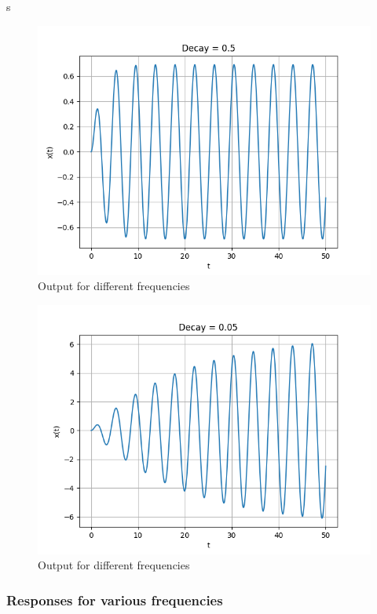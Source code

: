s\documentclass{article}
\begin{document}
 \begin{figure}[!ht]
  \centering
  \includegraphics[scale=0.5]{Figure_0.png}
  \caption{Output for different frequencies}
  \label{fig:sample}
  \end{figure}
 \begin{figure}[!ht]
  \centering
  \includegraphics[scale=0.5]{Figure_1.png}
  \caption{Output for different frequencies}
  \label{fig:sample}
  \end{figure}
 
\newpage
\subsubsection{Responses for various frequencies}
\end{document}
